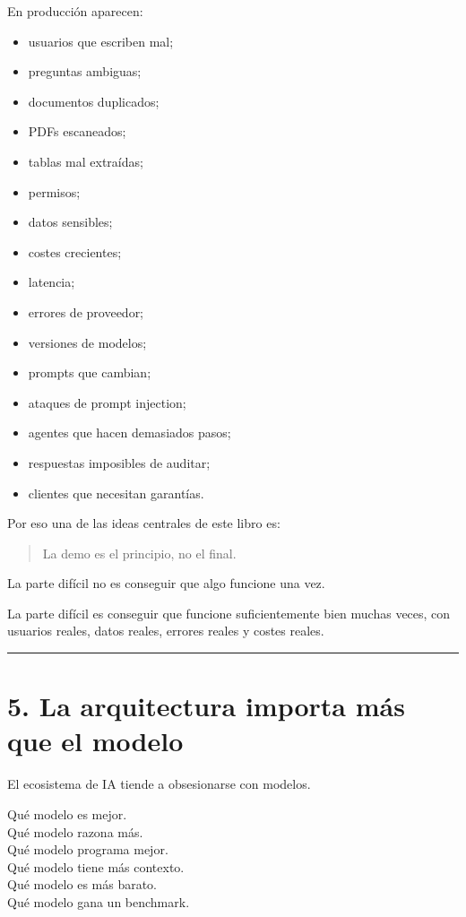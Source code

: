 En producción aparecen:

\begin{itemize}
\tightlist
\item
  usuarios que escriben mal;
\item
  preguntas ambiguas;
\item
  documentos duplicados;
\item
  PDFs escaneados;
\item
  tablas mal extraídas;
\item
  permisos;
\item
  datos sensibles;
\item
  costes crecientes;
\item
  latencia;
\item
  errores de proveedor;
\item
  versiones de modelos;
\item
  prompts que cambian;
\item
  ataques de prompt injection;
\item
  agentes que hacen demasiados pasos;
\item
  respuestas imposibles de auditar;
\item
  clientes que necesitan garantías.
\end{itemize}

Por eso una de las ideas centrales de este libro es:

\begin{quote}
La demo es el principio, no el final.
\end{quote}

La parte difícil no es conseguir que algo funcione una vez.

La parte difícil es conseguir que funcione suficientemente bien muchas
veces, con usuarios reales, datos reales, errores reales y costes
reales.

\begin{center}\rule{0.5\linewidth}{0.5pt}\end{center}

\section{5. La arquitectura importa más que el
modelo}\label{la-arquitectura-importa-muxe1s-que-el-modelo}

El ecosistema de IA tiende a obsesionarse con modelos.

Qué modelo es mejor.\\
Qué modelo razona más.\\
Qué modelo programa mejor.\\
Qué modelo tiene más contexto.\\
Qué modelo es más barato.\\
Qué modelo gana un benchmark.

